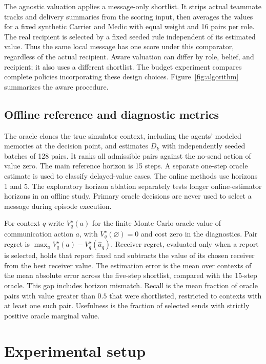 \documentclass{article}
\begin{document}
The agnostic valuation applies a message-only shortlist. It strips actual teammate tracks and delivery summaries from the scoring input, then averages the values for a fixed synthetic Carrier and Medic with equal weight and 16 pairs per role. The real recipient is selected by a fixed seeded rule independent of its estimated value. Thus the same local message has one score under this comparator, regardless of the actual recipient. Aware valuation can differ by role, belief, and recipient; it also uses a different shortlist. The budget experiment compares complete policies incorporating these design choices. Figure~\ref{fig:algorithm} summarizes the aware procedure.

\subsection{Offline reference and diagnostic metrics}

The oracle clones the true simulator context, including the agents' modeled memories at the decision point, and estimates $D_k$ with independently seeded batches of 128 pairs. It ranks all admissible pairs against the no-send action of value zero. The main reference horizon is 15 steps. A separate one-step oracle estimate is used to classify delayed-value cases. The online methods use horizons 1 and 5. The exploratory horizon ablation separately tests longer online-estimator horizons in an offline study. Primary oracle decisions are never used to select a message during episode execution.

For context $q$ write $V_q^\star(a)$ for the finite Monte Carlo oracle value of communication action $a$, with $V_q^\star(\varnothing)=0$ and cost zero in the diagnostics. Pair regret is $\max_a V_q^\star(a)-V_q^\star(\widehat a_q)$. Receiver regret, evaluated only when a report is selected, holds that report fixed and subtracts the value of its chosen receiver from the best receiver value. The estimation error is the mean over contexts of the mean absolute error across the five-step shortlist, compared with the 15-step oracle. This gap includes horizon mismatch. Recall is the mean fraction of oracle pairs with value greater than $0.5$ that were shortlisted, restricted to contexts with at least one such pair. Usefulness is the fraction of selected sends with strictly positive oracle marginal value.

\section{Experimental setup}
\end{document}
